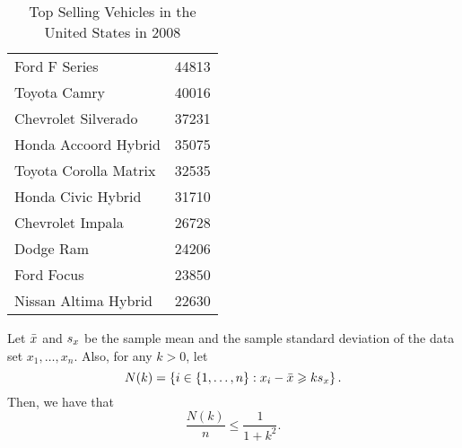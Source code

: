 \begin{example}
  \begin{table}[H]
    \centering
    \begin{tabular}{lr}
      Ford F Series         & 44813 \\
      Toyota Camry          & 40016 \\
      Chevrolet Silverado   & 37231 \\
      Honda Accoord Hybrid  & 35075 \\
      Toyota Corolla Matrix & 32535 \\
      Honda Civic Hybrid    & 31710 \\
      Chevrolet Impala      & 26728 \\
      Dodge Ram             & 24206 \\
      Ford Focus            & 23850 \\
      Nissan Altima Hybrid  & 22630
    \end{tabular}
    \caption{Top Selling Vehicles in the United States in 2008}
    \label{tbl:top-selling-vehicles-in-the-eua-in-2008}
  \end{table}
\end{example}

\begin{theorem}\label{thm:one-sided-chebyshev-inequality}
  Let \(\bar{x}\) and \(s_{x}\) be the sample mean
  and the sample standard deviation of the data set \(x_{1},\ldots,x_{n}\).
  Also, for any \(k>0\), let
  \[
    N(k)
    =
    \left\{
      i\in{\left\{1,\ldots,n\right\}}
      :
      x_{i}-\bar{x}
      \geqslant{ks_{x}}
    \right\}.
  \]
  Then, we have that
  \[
    \frac{N(k)}{n}\leqslant{\frac{1}{1+k^{2}}}.
  \]
\end{theorem}

